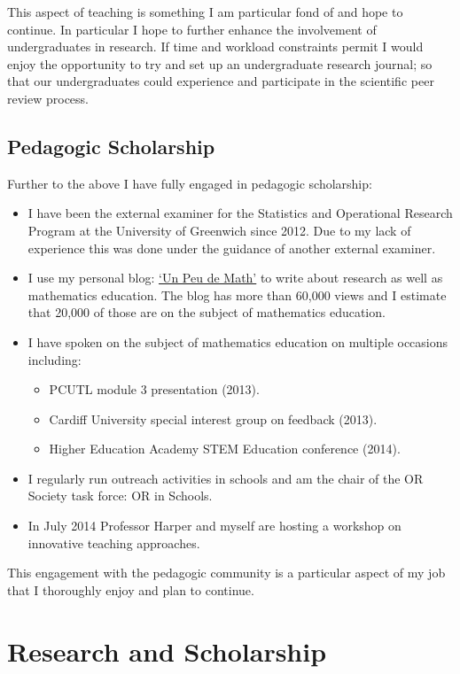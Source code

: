 \documentclass{article}
\begin{document}
This aspect of teaching is something I am particular fond of and hope to continue.
In particular I hope to further enhance the involvement of undergraduates in research.
If time and workload constraints permit I would enjoy the opportunity to try and set up an undergraduate research journal; so that our undergraduates could experience and participate in the scientific peer review process.

\subsection{Pedagogic Scholarship}

Further to the above I have fully engaged in pedagogic scholarship:

\begin{itemize}
    \item I have been the external examiner for the Statistics and Operational Research Program at the University of Greenwich since 2012.
    Due to my lack of experience this was done under the guidance of another external examiner.
    \item {I use my personal blog: \href{http://drvinceknight.blogspot.co.uk/}{`Un Peu de Math'} to write about research as well as mathematics education.
    The blog has more than 60,000 views and I estimate that 20,000 of those are on the subject of mathematics education.}
    \item I have spoken on the subject of mathematics education on multiple occasions including:
        \begin{itemize}
            \item PCUTL module 3 presentation (2013).
            \item Cardiff University special interest group on feedback (2013).
            \item Higher Education Academy STEM Education conference (2014).
        \end{itemize}
    \item I regularly run outreach activities in schools and am the chair of the OR Society task force: OR in Schools.
    \item In July 2014 Professor Harper and myself are hosting a workshop on innovative teaching approaches.
\end{itemize}

This engagement with the pedagogic community is a particular aspect of my job that I thoroughly enjoy and plan to continue.

\section{Research and Scholarship}\label{sec:research}
\end{document}
